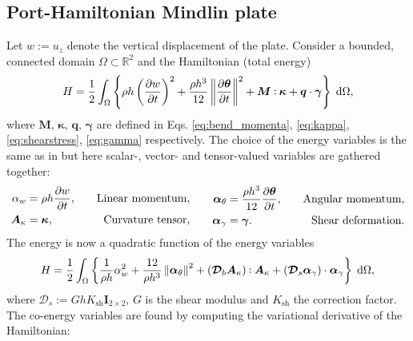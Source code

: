 \subsection{Port-Hamiltonian Mindlin plate}\label{sec:pHmin}
Let $w:= u_z$ denote the vertical displacement of the plate. Consider a bounded, connected domain $\Omega \subset \mathbb{R}^2$ and the Hamiltonian (total energy)
	\begin{equation}
	\label{eq:H_min}
	H = \frac{1}{2} \int_{\Omega}  \left\{ \rho h \left(\diffp{w}{t} \right)^2 + \frac{\rho h^3}{12} \norm{\diffp{\bm{\theta}}{t}}^2 +   \bm{M} \cddot \bm{\kappa} + \bm{q} \cdot \bm{\gamma}  \right\}  \d\Omega, 
	\end{equation}
	where $\bm{M},\, \bm{\kappa},\, \bm{q}, \, \bm{\gamma}$ are defined in Eqs. \eqref{eq:bend_momenta}, \eqref{eq:kappa}, \eqref{eq:shearstress}, \eqref{eq:gamma} respectively. 
	The choice of the energy variables is the same as in \cite{macchelli2005mindlin} but here scalar-,  vector- and tensor-valued variables are gathered together:
\begin{equation}\label{eq:alpha_Min}
\begin{aligned}
\alpha_w &= \rho h \diffp{w}{t}, \quad &\text{Linear momentum,} \\
\bm{A}_{\kappa} &= \bm{\kappa}, \quad &\text{Curvature tensor,} \\
\end{aligned} \qquad
\begin{aligned}
\bm\alpha_{\theta} &=  \frac{\rho h^3}{12} \diffp{\bm{\theta}}{t}, \quad &\text{Angular momentum,}\\
\bm\alpha_{\gamma} &= \bm{\gamma}. \quad &\text{Shear deformation.}\\
\end{aligned}
\end{equation}
The energy is now a quadratic function of the energy variables
\begin{equation}
\label{eq:Halpha_min}
H = \frac{1}{2} \int_{\Omega}  \left\{ \frac{1}{\rho h}\alpha_w^2 + \frac{12}{\rho h^3} \norm{\bm{\alpha}_{\theta}}^2 + (\bm{\mathcal{D}}_b \bm{A}_\kappa) \cddot \bm{A}_\kappa + (\bm{\mathcal{D}}_s \bm{\alpha}_\gamma) \cdot  \bm{\alpha}_\gamma  \right\}  \d\Omega, 
\end{equation}
where $\bm{\mathcal{D}}_s:= G h K_{\text{sh}} \bm{I}_{2\times 2}$, $G$ is the shear modulus  and $K_{\text{sh}}$ the correction factor. The co-energy variables are found by computing the variational derivative of the Hamiltonian:
